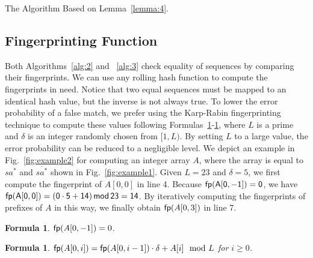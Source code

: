 \documentclass[10pt,journal,compsoc]{IEEEtran}
\newtheorem{formula}[theorem]{Formula}
\begin{document}
\begin{algorithm*}

	\caption{The Algorithm Based on Lemma~\ref{lemma:4}.}
	
	\label{alg:3}
	
\end{algorithm*}


\subsection{Fingerprinting Function}

Both Algorithms~\ref{alg:2} and ~\ref{alg:3} check equality of sequences by comparing their fingerprints. We can use any rolling hash function to compute the fingerprints in need. Notice that two equal sequences must be mapped to an identical hash value, but the inverse is not always true. To lower the error probability of a false match, we prefer using the Karp-Rabin fingerprinting technique to compute these values following Formulas~\ref{formula:1}-\ref{formula:2}, where $L$ is a prime and $\delta$ is an integer randomly chosen from $[1, L)$. By setting $L$ to a large value, the error probability can be reduced to a negligible level. We depict an example in Fig.~\ref{fig:example2} for computing an integer array $A$, where the array is equal to $sa^*$ and $\overline{sa^*}$ shown in Fig.~\ref{fig:example1}. Given $L = 23$ and $\delta = 5$, we first compute the fingerprint of $A[0, 0]$ in line 4. Because $\sf fp(A[0, -1]) = 0$, we have $\sf fp(A[0, 0]) = (0 \cdot 5 + 14) \, mod \, 23 = 14$.  By iteratively computing the fingerprints of prefixes of $A$ in this way, we finally obtain ${\sf fp}(A[0, 3])$ in line 7.

\begin{formula} \label{formula:1}${\sf fp}(A[0, -1]) = 0$.
\end{formula}

\begin{formula} \label{formula:2}${\sf fp}(A[0, i]) = {\sf fp}(A[0, i - 1]) \cdot {\delta} + A[i]\mod L$ for $i \ge 0$.
\end{formula}
\end{document}

